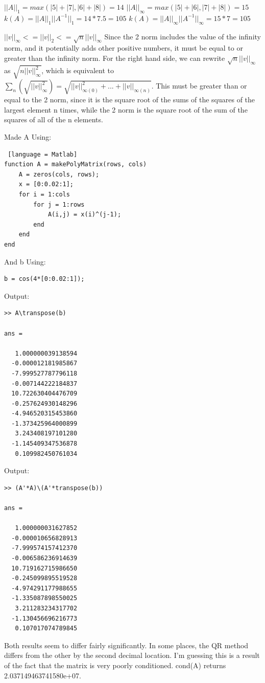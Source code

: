 \documentclass[12pt]{article}
\makeatletter
\theoremstyle{homework}
\newenvironment{exercise}[1]
{\def\@currentlabel{#1}\exercisecore}
{\endexercisecore}
\makeatother
\begin{document}
\begin{exercise}{Exercise 7.9}
\end{exercise}
$||A||_{1} = max(|5|+|7|, |6|+|8|) = 14$
\newline
$||A||_{\infty} = max(|5|+|6|, |7|+|8|) = 15$
\newline
$k(A) = ||A||_{1}||A^{-1}||_{1} = 14 * 7.5 = 105$
\newline
$k(A) = ||A||_{\infty}||A^{-1}||_{\infty} = 15 * 7 = 105$

\begin{exercise}{Exercise 7.10}
\end{exercise}
$||v||_{\infty} <= ||v||_{2} <= \sqrt{n}||v||_{\infty}$
\newline
Since the 2 norm includes the value of the infinity norm, and it potentially adds other positive numbers, it must be equal to or greater than
the infinity norm. For the right hand side, we can rewrite $\sqrt{n}||v||_{\infty}$ as $\sqrt{n||v||_{\infty}^2}$, which is equivalent to 
$\sum_{n}(\sqrt{||v||_{\infty}^2}) = \sqrt{||v||_{\infty(0)}^2 + ... + ||v||_{\infty(n)}}$. This must be greater than or equal to the 2 norm, since it 
is the square root of the sums of the squares of the largest element n times, while the 2 norm is the square root of the sum of the squares of all of the n
elements.
\newline

\begin{exercise}{Exercise 7.14}
\end{exercise}
Made A Using:
\begin{lstlisting} [language = Matlab]
function A = makePolyMatrix(rows, cols)
    A = zeros(cols, rows);
    x = [0:0.02:1];
    for i = 1:cols
        for j = 1:rows
            A(i,j) = x(i)^(j-1);
        end
    end
end
\end{lstlisting}
And b Using:
\begin{lstlisting}
b = cos(4*[0:0.02:1]);
\end{lstlisting}
Output:
\begin{lstlisting}
>> A\transpose(b)

ans =

   1.000000039138594
  -0.000012181985867
  -7.999527787796118
  -0.007144222184837
  10.722630404476709
  -0.257624930148296
  -4.946520315453860
  -1.373425964000899
   3.243408197101280
  -1.145409347536878
   0.109982450761034
\end{lstlisting}
Output:
\begin{lstlisting}
>> (A'*A)\(A'*transpose(b))

ans =

   1.000000031627852
  -0.000010656828913
  -7.999574157412370
  -0.006586236914639
  10.719162715986650
  -0.245099895519528
  -4.974291177988655
  -1.335087898550025
   3.211283234317702
  -1.130456696216773
   0.107017074789845
\end{lstlisting}
Both results seem to differ fairly significantly. In some places, the QR method differs from the other
by the second decimal location. I'm guessing this is a result of the fact that the matrix is very poorly
conditioned. cond(A) returns 2.037149463741580e+07.
\end{document}
